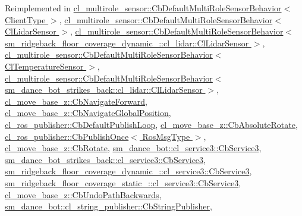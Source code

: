 Reimplemented in \hyperlink{classcl__multirole__sensor_1_1CbDefaultMultiRoleSensorBehavior_a5ac29f93cc91e23715f51ade94467cae}{cl\+\_\+multirole\+\_\+sensor\+::\+Cb\+Default\+Multi\+Role\+Sensor\+Behavior$<$ Client\+Type $>$}, \hyperlink{classcl__multirole__sensor_1_1CbDefaultMultiRoleSensorBehavior_a5ac29f93cc91e23715f51ade94467cae}{cl\+\_\+multirole\+\_\+sensor\+::\+Cb\+Default\+Multi\+Role\+Sensor\+Behavior$<$ Cl\+Lidar\+Sensor $>$}, \hyperlink{classcl__multirole__sensor_1_1CbDefaultMultiRoleSensorBehavior_a5ac29f93cc91e23715f51ade94467cae}{cl\+\_\+multirole\+\_\+sensor\+::\+Cb\+Default\+Multi\+Role\+Sensor\+Behavior$<$ sm\+\_\+ridgeback\+\_\+floor\+\_\+coverage\+\_\+dynamic\+\_\+::cl\+\_\+lidar\+::\+Cl\+Lidar\+Sensor $>$}, \hyperlink{classcl__multirole__sensor_1_1CbDefaultMultiRoleSensorBehavior_a5ac29f93cc91e23715f51ade94467cae}{cl\+\_\+multirole\+\_\+sensor\+::\+Cb\+Default\+Multi\+Role\+Sensor\+Behavior$<$ Cl\+Temperature\+Sensor $>$}, \hyperlink{classcl__multirole__sensor_1_1CbDefaultMultiRoleSensorBehavior_a5ac29f93cc91e23715f51ade94467cae}{cl\+\_\+multirole\+\_\+sensor\+::\+Cb\+Default\+Multi\+Role\+Sensor\+Behavior$<$ sm\+\_\+dance\+\_\+bot\+\_\+strikes\+\_\+back\+::cl\+\_\+lidar\+::\+Cl\+Lidar\+Sensor $>$}, \hyperlink{classcl__move__base__z_1_1CbNavigateForward_af9a2e49071de287922c3f5963a079b95}{cl\+\_\+move\+\_\+base\+\_\+z\+::\+Cb\+Navigate\+Forward}, \hyperlink{classcl__move__base__z_1_1CbNavigateGlobalPosition_a66d8b0555ef2945bc108dcd5171be292}{cl\+\_\+move\+\_\+base\+\_\+z\+::\+Cb\+Navigate\+Global\+Position}, \hyperlink{classcl__ros__publisher_1_1CbDefaultPublishLoop_a6e6cfb477cbefc510ca7b55a061545e4}{cl\+\_\+ros\+\_\+publisher\+::\+Cb\+Default\+Publish\+Loop}, \hyperlink{classcl__move__base__z_1_1CbAbsoluteRotate_a10418ea360809fa649d295716b152b2b}{cl\+\_\+move\+\_\+base\+\_\+z\+::\+Cb\+Absolute\+Rotate}, \hyperlink{classcl__ros__publisher_1_1CbPublishOnce_afaed71bc2694ec1837278d5f931a76e1}{cl\+\_\+ros\+\_\+publisher\+::\+Cb\+Publish\+Once$<$ Ros\+Msg\+Type $>$}, \hyperlink{classcl__move__base__z_1_1CbRotate_a316ee51ecfd3f10fd1edae0d7d3b26c0}{cl\+\_\+move\+\_\+base\+\_\+z\+::\+Cb\+Rotate}, \hyperlink{classsm__dance__bot_1_1cl__service3_1_1CbService3_ae9e3796b507ad96cc0890fec0f64a4b7}{sm\+\_\+dance\+\_\+bot\+::cl\+\_\+service3\+::\+Cb\+Service3}, \hyperlink{classsm__dance__bot__strikes__back_1_1cl__service3_1_1CbService3_a09a2fda38973e1e3915b63a47ca67ed1}{sm\+\_\+dance\+\_\+bot\+\_\+strikes\+\_\+back\+::cl\+\_\+service3\+::\+Cb\+Service3}, \hyperlink{classsm__ridgeback__floor__coverage__dynamic__1_1_1cl__service3_1_1CbService3_a2bea1cd5cff40e33307b0858ea9baf0b}{sm\+\_\+ridgeback\+\_\+floor\+\_\+coverage\+\_\+dynamic\+\_\+::cl\+\_\+service3\+::\+Cb\+Service3}, \hyperlink{classsm__ridgeback__floor__coverage__static__1_1_1cl__service3_1_1CbService3_a0eda2e4af98ebc090234b7f7eacced89}{sm\+\_\+ridgeback\+\_\+floor\+\_\+coverage\+\_\+static\+\_\+::cl\+\_\+service3\+::\+Cb\+Service3}, \hyperlink{classcl__move__base__z_1_1CbUndoPathBackwards_a32e680530375b62c7053bf173f6b2b1b}{cl\+\_\+move\+\_\+base\+\_\+z\+::\+Cb\+Undo\+Path\+Backwards}, \hyperlink{classsm__dance__bot_1_1cl__string__publisher_1_1CbStringPublisher_a7aa533578e820ee90d92d15b85d42e9b}{sm\+\_\+dance\+\_\+bot\+::cl\+\_\+string\+\_\+publisher\+::\+Cb\+String\+Publisher}, 